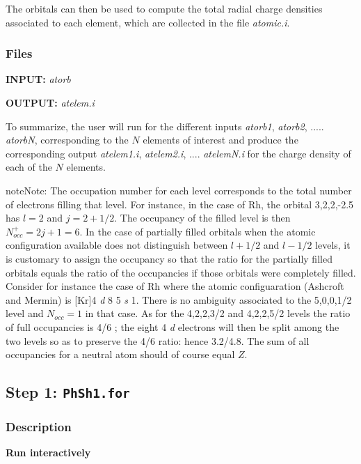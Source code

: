 \documentclass[letterpaper,10pt,english]{sphinxmanual}
\begin{document}
The orbitals can then be used to compute the total radial charge
densities associated to each element, which are collected in the
file \emph{atomic.i}.


\subsubsection{Files}
\label{phshift2007:files}
\textbf{INPUT:} \emph{atorb}

\textbf{OUTPUT:} \emph{atelem.i}

To summarize, the user will run  for the different inputs
\emph{atorb1}, \emph{atorb2}, ..... \emph{atorbN}, corresponding to the $N$ elements of
interest and produce the corresponding output \emph{atelem1.i},
\emph{atelem2.i}, .... \emph{atelemN.i} for the charge density of each of the
$N$ elements.

\begin{notice}{note}{Note:}
The occupation number for each level corresponds to the
total number of electrons filling that level. For
instance, in the case of Rh, the orbital 3,2,2,-2.5
has $l = 2$ and $j = 2 + 1/2$. The occupancy of the filled level
is then $N^+_{occ} = 2j + 1 = 6$.
In the case of partially filled orbitals when the atomic
configuration available does not distinguish between
$l + 1/2$ and $l - 1/2$ levels, it is customary to assign the
occupancy so that the ratio for the partially filled
orbitals equals the ratio of the occupancies if those
orbitals were completely filled. Consider for instance
the case of Rh where the atomic configuaration (Ashcroft
and Mermin) is {[}Kr{]}4 \emph{d} 8 5 \emph{s} 1. There is no ambiguity
associated to the 5,0,0,1/2 level and $N_{occ} = 1$ in that case.
As for the 4,2,2,3/2 and 4,2,2,5/2 levels the ratio of
full occupancies is 4/6 ; the eight 4 \emph{d} electrons will then be
split among the two levels so as to preserve the 4/6
ratio: hence 3.2/4.8. The sum of all occupancies for a
neutral atom should of course equal $Z$.
\end{notice}


\subsection{Step 1: \texttt{PhSh1.for}}
\label{phshift2007:step-1-phsh1-for}

\subsubsection{Description}
\label{phshift2007:id1}
\textbf{Run interactively}
\end{document}
